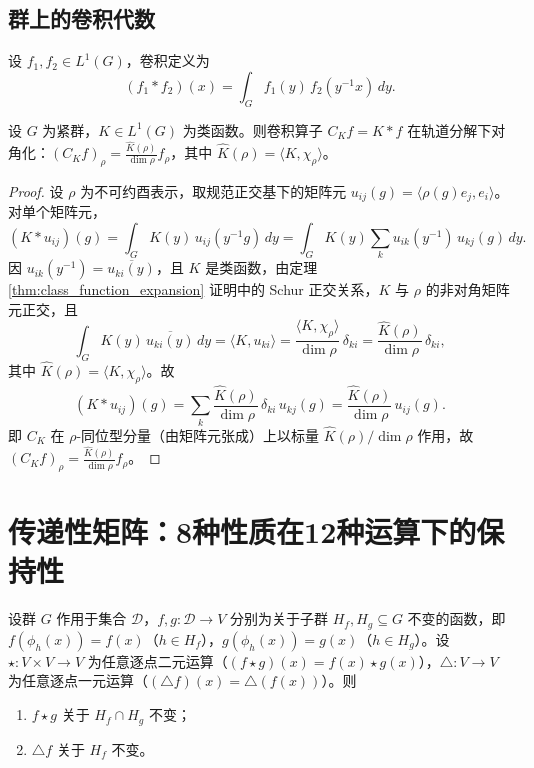 \subsection{群上的卷积代数}

\begin{definition}[群上的卷积]
\label{def:group_convolution}
设 $f_1, f_2 \in L^1(G)$，卷积定义为
\[
(f_1 * f_2)(x) = \int_G f_1(y)\, f_2(y^{-1}x) \, dy.
\]
\end{definition}

\begin{proposition}[卷积在轨道分解下的对角化]\label{prop:convolution_orbit}
设 $G$ 为紧群，$K \in L^1(G)$ 为类函数。则卷积算子 $C_K f = K * f$ 在轨道分解下对角化：$(C_K f)_\rho = \frac{\hat{K}(\rho)}{\dim \rho} f_\rho$，其中 $\hat{K}(\rho)=\langle K,\chi_\rho\rangle$。
\end{proposition}

\begin{proof}
设 $\rho$ 为不可约酉表示，取规范正交基下的矩阵元 $u_{ij}(g)=\langle\rho(g)e_j,e_i\rangle$。对单个矩阵元，
\[
(K*u_{ij})(g)=\int_G K(y)\,u_{ij}(y^{-1}g)\,dy=\int_G K(y)\sum_k u_{ik}(y^{-1})\,u_{kj}(g)\,dy.
\]
因 $u_{ik}(y^{-1})=\overline{u_{ki}(y)}$，且 $K$ 是类函数，由定理 \ref{thm:class_function_expansion} 证明中的 Schur 正交关系，$K$ 与 $\rho$ 的非对角矩阵元正交，且
\[
\int_G K(y)\,\overline{u_{ki}(y)}\,dy=\langle K,u_{ki}\rangle=\frac{\langle K,\chi_\rho\rangle}{\dim\rho}\,\delta_{ki}=\frac{\hat K(\rho)}{\dim\rho}\,\delta_{ki},
\]
其中 $\hat K(\rho)=\langle K,\chi_\rho\rangle$。故
\[
(K*u_{ij})(g)=\sum_k\frac{\hat K(\rho)}{\dim\rho}\,\delta_{ki}\,u_{kj}(g)=\frac{\hat K(\rho)}{\dim\rho}\,u_{ij}(g).
\]
即 $C_K$ 在 $\rho$-同位型分量（由矩阵元张成）上以标量 $\hat K(\rho)/\dim\rho$ 作用，故 $(C_K f)_\rho=\frac{\hat K(\rho)}{\dim\rho}f_\rho$。
\end{proof}

\section{\texorpdfstring{传递性矩阵：8种性质在12种运算下的保持性}{传递性矩阵}}

\begin{lemma}[逐点运算与群作用交换]\label{ch8_pointwise_invariance}
设群 $G$ 作用于集合 $\mathcal{D}$，$f,g:\mathcal{D}\to V$ 分别为关于子群 $H_f,H_g\subseteq G$ 不变的函数，即 $f(\phi_h(x))=f(x)$（$h\in H_f$），$g(\phi_h(x))=g(x)$（$h\in H_g$）。设 $\star:V\times V\to V$ 为任意逐点二元运算（$(f\star g)(x)=f(x)\star g(x)$），$\triangle:V\to V$ 为任意逐点一元运算（$(\triangle f)(x)=\triangle(f(x))$）。则
\begin{enumerate}[label=(\roman*)]
    \item $f\star g$ 关于 $H_f\cap H_g$ 不变；
    \item $\triangle f$ 关于 $H_f$ 不变。
\end{enumerate}
\end{lemma}

